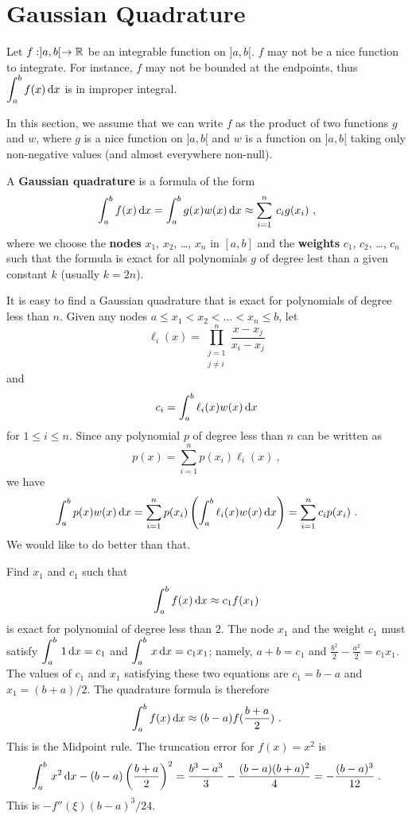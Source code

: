 \section{Gaussian Quadrature}\label{GaussGuadrSect}

Let $f:]a,b[ \rightarrow \mathbb{R}$ be an integrable function on $]a,b[$.
$f$ may not be a nice function to integrate.  For instance, $f$ may
not be bounded at the endpoints, thus
$\displaystyle \int_a^b f(x) \,\mathrm{d}x$ is in improper integral.

In this section, we assume that we can write $f$ as the product of two
functions $g$ and $w$, where $g$ is a nice function on $]a,b[$
and $w$ is a function on $]a,b[$ taking only non-negative values (and
almost everywhere non-null).

\begin{defn}
A {\bfseries Gaussian quadrature} is a formula of the form 
\begin{equation} \label{GG}
\int_a^b f(x) \,\mathrm{d}x = \int_a^b g(x)w(x) \,\mathrm{d}x \approx
\sum_{i=1}^n \,c_i g(x_i) \ ,
\end{equation}
where we choose the {\bfseries nodes} $x_1$,
$x_2$, \ldots, $x_n$ in $[a,b]$ and the
{\bfseries weights} $c_1$, $c_2$, \ldots,
$c_n$ such that the formula is exact for all polynomials $g$ of degree
lest than a given constant $k$ (usually $k = 2n$).
\end{defn}

It is easy to find a Gaussian quadrature that is exact for polynomials
of degree less than $n$.  Given any nodes
$a \leq x_1 < x_2 < \ldots < x_n \leq b$, let
\[
 \ell_i(x) =  \prod_{\substack{j=1 \\ j\neq i}}^n   \frac{x-x_j}{x_i-x_j}
\]
and
\begin{equation}\label{GquadrCoeff}
    c_i = \int_a^b \ell_i(x)  w(x) \,\mathrm{d}x
\end{equation}
for $1\leq i \leq n$.  Since any polynomial $p$ of degree less than $n$
can be written as
\[
p(x) = \sum_{i=1}^n p(x_i) \ell_i(x) \ ,
\]
we have
\[
\int_a^b p(x) w(x) \,\mathrm{d}x = 
\sum_{i=1}^n p(x_i) \left( \int_a^b \ell_i(x) w(x) \,\mathrm{d}x \right)
= \sum_{i=1}^n c_i p(x_i) \ .
\]
We would like to do better than that.

\begin{egg}
Find $x_1$ and $c_1$ such that
\[
\int_a^b f(x) \,\mathrm{d}x \approx c_1 f(x_1)
\]
is exact for polynomial of degree less than $2$.  The node $x_1$ and
the weight $c_1$ must satisfy
$\displaystyle \int_a^b\, 1 \,\mathrm{d}x = c_1$ and
$\displaystyle \int_a^b\, x \,\mathrm{d}x = c_1 x_1$; namely,
$a+b = c_1$ and $\displaystyle \frac{b^2}{2} - \frac{a^2}{2} = c_1 x_1$.
The values of $c_1$ and $x_1$ satisfying these two equations are $c_1
= b - a$ and $x_1 = (b+a)/2$.  The quadrature formula is therefore
\[
\int_a^b f(x) \,\mathrm{d}x \approx  (b-a) f(\frac{b+a}{2}) \ .
\]
This is the Midpoint rule.  The truncation error for $f(x) = x^2$ is
\[
\int_a^b \, x^2 \,\mathrm{d}x - (b-a) \left( \frac{b+a}{2} \right)^2 =
\frac{b^3-a^3}{3} - \frac{(b-a)(b+a)^2}{4} = - \frac{(b-a)^3}{12} \;.
\]
This is $-f''(\xi) (b-a)^3/24$.
\end{egg}

